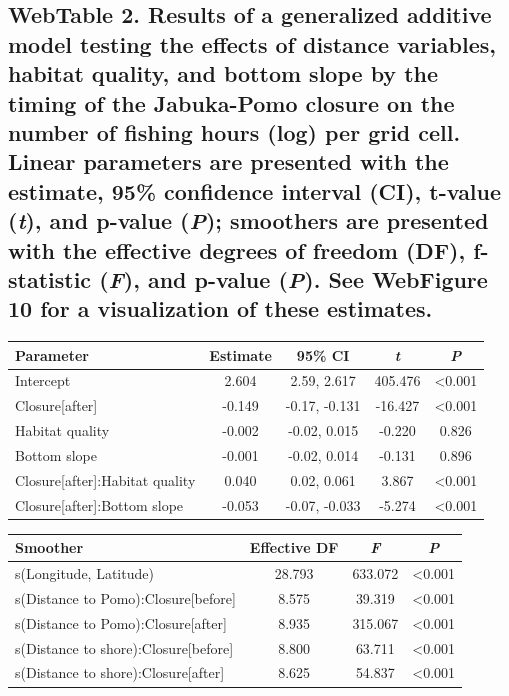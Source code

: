 \documentclass[11pt,]{article}
\begin{document}
\newpage

\subsection{\texorpdfstring{WebTable 2. Results of a generalized
additive model testing the effects of distance variables, habitat
quality, and bottom slope by the timing of the Jabuka-Pomo closure on
the number of fishing hours (log) per grid cell. Linear parameters are
presented with the estimate, 95\% confidence interval (CI), t-value
(\emph{t}), and p-value (\emph{P}); smoothers are presented with the
effective degrees of freedom (DF), f-statistic (\emph{F}), and p-value
(\emph{P}). See WebFigure 10 for a visualization of these
estimates.}{WebTable 2. Results of a generalized additive model testing the effects of distance variables, habitat quality, and bottom slope by the timing of the Jabuka-Pomo closure on the number of fishing hours (log) per grid cell. Linear parameters are presented with the estimate, 95\% confidence interval (CI), t-value (t), and p-value (P); smoothers are presented with the effective degrees of freedom (DF), f-statistic (F), and p-value (P). See WebFigure 10 for a visualization of these estimates.}}\label{webtable-2.-results-of-a-generalized-additive-model-testing-the-effects-of-distance-variables-habitat-quality-and-bottom-slope-by-the-timing-of-the-jabuka-pomo-closure-on-the-number-of-fishing-hours-log-per-grid-cell.-linear-parameters-are-presented-with-the-estimate-95-confidence-interval-ci-t-value-t-and-p-value-p-smoothers-are-presented-with-the-effective-degrees-of-freedom-df-f-statistic-f-and-p-value-p.-see-webfigure-10-for-a-visualization-of-these-estimates.}

\begin{longtable}[]{@{}lcccc@{}}
\toprule
Parameter & Estimate & 95\% CI & \emph{t} & \emph{P}\tabularnewline
\midrule
\endhead
Intercept & 2.604 & 2.59, 2.617 & 405.476 &
\textless{}0.001\tabularnewline
Closure{[}after{]} & -0.149 & -0.17, -0.131 & -16.427 &
\textless{}0.001\tabularnewline
Habitat quality & -0.002 & -0.02, 0.015 & -0.220 & 0.826\tabularnewline
Bottom slope & -0.001 & -0.02, 0.014 & -0.131 & 0.896\tabularnewline
Closure{[}after{]}:Habitat quality & 0.040 & 0.02, 0.061 & 3.867 &
\textless{}0.001\tabularnewline
Closure{[}after{]}:Bottom slope & -0.053 & -0.07, -0.033 & -5.274 &
\textless{}0.001\tabularnewline
\bottomrule
\end{longtable}

\begin{longtable}[]{@{}lccc@{}}
\toprule
Smoother & Effective DF & \emph{F} & \emph{P}\tabularnewline
\midrule
\endhead
s(Longitude, Latitude) & 28.793 & 633.072 &
\textless{}0.001\tabularnewline
s(Distance to Pomo):Closure{[}before{]} & 8.575 & 39.319 &
\textless{}0.001\tabularnewline
s(Distance to Pomo):Closure{[}after{]} & 8.935 & 315.067 &
\textless{}0.001\tabularnewline
s(Distance to shore):Closure{[}before{]} & 8.800 & 63.711 &
\textless{}0.001\tabularnewline
s(Distance to shore):Closure{[}after{]} & 8.625 & 54.837 &
\textless{}0.001\tabularnewline
\bottomrule
\end{longtable}
\end{document}
